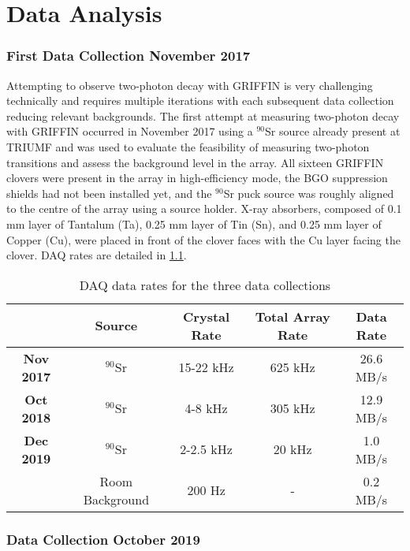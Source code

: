 \documentclass[cnatzke_thesis_proposal.tex]{subfiles}
\begin{document}
\chapter{Data Analysis}

\subsection{First Data Collection November 2017}
Attempting to observe two-photon decay with GRIFFIN is very challenging technically and requires multiple iterations with each subsequent data collection reducing relevant backgrounds. 
The first attempt at measuring two-photon decay with GRIFFIN occurred in November 2017 using a $^{90}$Sr source already present at TRIUMF and was used to evaluate the feasibility of measuring two-photon transitions and assess the background level in the array. 
All sixteen GRIFFIN clovers were present in the array in high-efficiency mode, the BGO suppression shields had not been installed yet, and the $^{90}$Sr puck source was roughly aligned to the centre of the array using a source holder. 
X-ray absorbers, composed of 0.1 mm layer of Tantalum (Ta), 0.25 mm layer of Tin (Sn), and 0.25 mm layer of Copper (Cu), were placed in front of the clover faces with the Cu layer facing the clover. 
DAQ rates are detailed in \ref{tab:daq_rates}.

\begin{table}[]
  \centering
  \begin{tabular}{ccccc}
                    & Source          & Crystal Rate & Total Array Rate & Data Rate \\ \hline
  \textbf{Nov 2017} & $^{90}$Sr       & 15-22 kHz    & 625 kHz          & 26.6 MB/s \\ \hline
  \textbf{Oct 2018} & $^{90}$Sr       & 4-8 kHz      & 305 kHz          & 12.9 MB/s \\ \hline
  \textbf{Dec 2019} & $^{90}$Sr       & 2-2.5 kHz    & 20 kHz           & 1.0 MB/s  \\ 
                    & Room Background & 200 Hz       & -                & 0.2 MB/s  \\ \hline
  \end{tabular}
  \caption{DAQ data rates for the three data collections}
  \label{tab:daq_rates}
\end{table}


\subsection{Data Collection October 2019}
\end{document}
